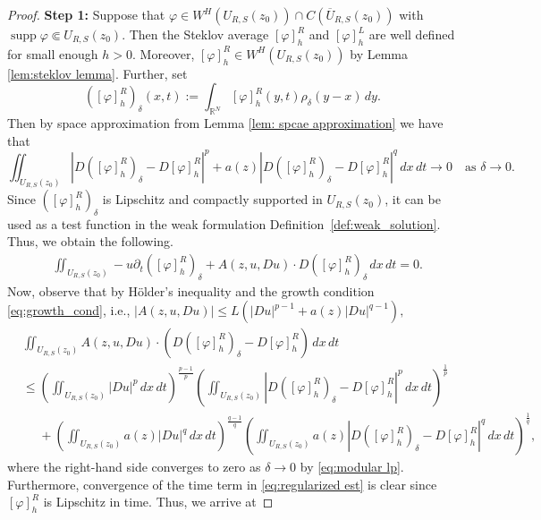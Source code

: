 \documentclass[notitlepage,11pt,reqno]{amsart}
\theoremstyle{definition}
\numberwithin{equation}{section}
\newcommand{\RR}{\mathds{R}}
\DeclareMathOperator*{\supp}{supp}
\begin{document}
\begin{proof}
 \textbf{Step 1:} Suppose that $\varphi\in W^H(U_{R, S}(z_0))\cap C(\overline{U}_{R, S}(z_0))$ with $\supp \varphi \Subset U_{R, S}(z_0)$. Then the Steklov average $[\varphi]^R_h$ and $[\varphi]^L_h$ are well defined for small enough $h>0$. Moreover, $[\varphi]^R_h \in W^H(U_{R, S}(z_0))$ by Lemma \ref{lem:steklov lemma}.
Further, set
\[
([\varphi]^R_{h})_{\delta}(x,t):=\int_{\RR^{N}}[\varphi]^R_{h}(y,t)\rho_{\delta}(y-x)\, dy.
\]
Then by space approximation from Lemma \ref{lem: spcae approximation} we have that
\begin{equation}
\iint_{U_{R, S}(z_0)}\left|D([\varphi]^R_{h})_{\delta}-D[\varphi]^R_{h}\right|^{p}+a(z)\left|D([\varphi]^R_h)_{\delta}-D[\varphi]^R_{h}\right|^{q}\,dx\, dt\rightarrow0\quad\text{as }\delta\rightarrow0.\label{eq:modular lp}
\end{equation}
Since $([\varphi]^R_{h})_{\delta}$ is Lipschitz and compactly supported
in $U_{R, S}(z_0)$, it can be used as a test function in the weak formulation Definition~\ref{def:weak_solution}. Thus, we obtain the following.
\begin{equation}
\begin{aligned}
&\iint_{U_{R, S}(z_0)}-u\partial_{t}([\varphi]^R_{h})_{\delta}+A(z, u,  Du)\cdot D([\varphi]^R_{h})_{\delta}\, dx\, dt=0.\label{eq:regularized est}
\end{aligned}
\end{equation}
Now, observe that by H\"{o}lder's inequality and the growth condition \eqref{eq:growth_cond}, i.e., $|A(z, u, Du)|\leq L(|Du|^{p-1}+a(z)|Du|^{q-1}),$
\begin{align*}
 & \iint_{U_{R, S}(z_0)}A(z, u, Du)\cdot(D([\varphi]^R_{h})_{\delta}-D[\varphi]^R_{h})\, dx\, dt\\
 & \leq\left(\iint_{U_{R, S}(z_0)}\left|Du\right|^{p} \,dx\, dt\right)^{\frac{p-1}{p}}\left(\iint_{U_{R, S}(z_0)}\left|D([\varphi]^R_{h})_{\delta}-D[\varphi]^R_{h}\right|^{p} \,dx\, dt\right)^{\frac{1}{p}}\\
 & \phantom{\leq}+\left(\iint_{U_{R, S}(z_0)}a(z)\left|Du\right|^{q} \,dx\, dt\right)^{\frac{q-1}{q}}\left(\iint_{U_{R, S}(z_0)}a(z)\left|D([\varphi]^R_{h})_{\delta}-D[\varphi]^R_{h}\right|^{q} \,dx\, dt\right)^{\frac{1}{q}},
\end{align*}
where the right-hand side converges to zero as $\delta\rightarrow0$
by \eqref{eq:modular lp}. Furthermore, convergence of the time term
in \eqref{eq:regularized est} is clear since $[\varphi]^R_{h}$ is Lipschitz
in time. Thus, we arrive at

\end{proof}
\end{document}
